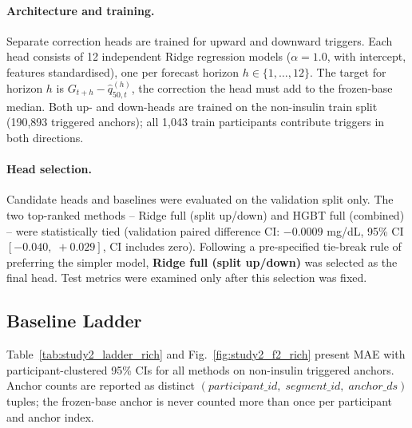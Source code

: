 \paragraph{Architecture and training.}
Separate correction heads are trained for upward and downward triggers.
Each head consists of 12 independent Ridge regression models
($\alpha=1.0$, with intercept, features standardised),
one per forecast horizon $h \in \{1,\ldots,12\}$.
The target for horizon $h$ is $G_{t+h} - \hat{q}_{50,t}^{(h)}$, the
correction the head must add to the frozen-base median.
Both up- and down-heads are trained on the non-insulin train split
(190{,}893 triggered anchors); all 1{,}043 train participants contribute
triggers in both directions.

\paragraph{Head selection.}
Candidate heads and baselines were evaluated on the validation split only.
The two top-ranked methods -- Ridge full (split up/down) and HGBT full
(combined) -- were statistically tied (validation paired difference CI:
$-0.0009$ mg/dL, 95\% CI $[-0.040,\;+0.029]$, CI includes zero).
Following a pre-specified tie-break rule of preferring the simpler model,
\textbf{Ridge full (split up/down)} was selected as the final head.
Test metrics were examined only after this selection was fixed.

\subsection{Baseline Ladder}
\label{subsec:study2_ladder}

Table~\ref{tab:study2_ladder_rich} and Fig.~\ref{fig:study2_f2_rich} present
MAE with participant-clustered 95\% CIs for all methods on non-insulin
triggered anchors.
Anchor counts are reported as distinct $(participant\_id,\;segment\_id,\;anchor\_ds)$
tuples; the frozen-base anchor is never counted more than once per participant
and anchor index.

